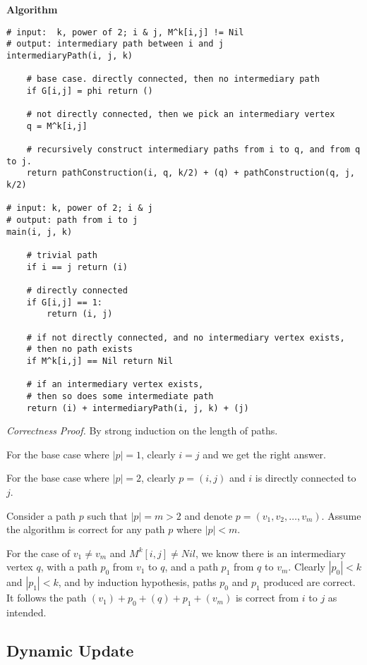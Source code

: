 \textbf{Algorithm}
\begin{verbatim}
# input:  k, power of 2; i & j, M^k[i,j] != Nil
# output: intermediary path between i and j
intermediaryPath(i, j, k)

    # base case. directly connected, then no intermediary path
    if G[i,j] = phi return ()
    
    # not directly connected, then we pick an intermediary vertex
    q = M^k[i,j]
    
    # recursively construct intermediary paths from i to q, and from q to j.
    return pathConstruction(i, q, k/2) + (q) + pathConstruction(q, j, k/2)

# input: k, power of 2; i & j
# output: path from i to j
main(i, j, k)

    # trivial path
    if i == j return (i)

    # directly connected
    if G[i,j] == 1:
        return (i, j)

    # if not directly connected, and no intermediary vertex exists,
    # then no path exists
    if M^k[i,j] == Nil return Nil

    # if an intermediary vertex exists,
    # then so does some intermediate path
    return (i) + intermediaryPath(i, j, k) + (j)
\end{verbatim}

\textit{Correctness Proof.} By strong induction on the length of paths.

For the base case where $|p| = 1$, clearly $i = j$ and we get the right answer.

For the base case where $|p| = 2$, clearly $p = (i,j)$ and $i$ is directly connected to $j$.

Consider a path $p$ such that $|p| = m > 2$ and denote $p = (v_1, v_2, \dots, v_m)$. Assume the algorithm is correct for any path $p$ where $|p| < m$.

For the case of $v_1 \neq v_m$ and $M^k[i,j] \neq Nil$, we know there is an intermediary vertex $q$, with a path $p_0$ from $v_1$ to $q$, and a path $p_1$ from $q$ to $v_m$. Clearly $|p_0| < k$ and $|p_1| < k$, and by induction hypothesis, paths $p_0$ and $p_1$ produced are correct. It follows the path $(v_1) + p_0 + (q) + p_1 + (v_m)$ is correct from $i$ to $j$ as intended.


\subsection{Dynamic Update}

